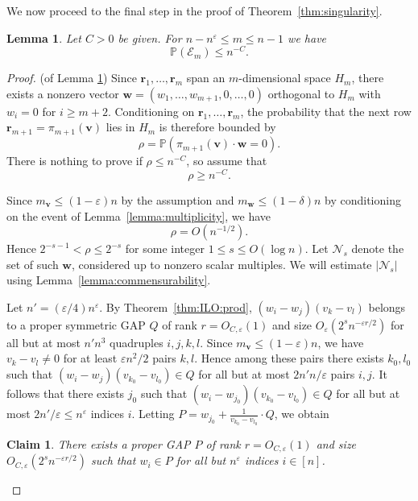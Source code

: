 \documentclass[reqno]{amsart}
\renewcommand\P{{\mathbb{P}}}
\newcommand\eps{{\varepsilon}}
\newcommand\BMr{{\bm r}}
\newcommand\BMv{{\bm v}}
\newcommand\BMw{{\bm w}}
\newcommand\CE{{\mathcal E}}
\newcommand\CN{{\mathcal N}}
\theoremstyle{plain}
\newtheorem{lemma}[theorem]{Lemma}
\newtheorem{claim}[theorem]{Claim}
\theoremstyle{definition}
\begin{document}
We now proceed to the final step in the proof of Theorem~\ref{thm:singularity}. 

\begin{lemma}\label{lemma:large:m}
Let $C>0$ be given. For $n-n^{\eps} \le m \le n-1$ we have
\[
\P(\CE_{m}) \le n^{-C}.
\]
\end{lemma}

\begin{proof}(of Lemma \ref{lemma:large:m}) Since $\BMr_1,\ldots,\BMr_m$ span an $m$-dimensional space $H_m$, there exists a nonzero vector
$\BMw=(w_1,\ldots,w_{m+1},0,\ldots,0)$ orthogonal to $H_m$ with $w_i=0$ for $i\ge m+2$.
Conditioning on $\BMr_1,\ldots,\BMr_m$, the probability that the next row
$\BMr_{m+1}=\pi_{m+1}(\BMv)$ lies in $H_m$ is therefore bounded by
\[
\rho = \P(\pi_{m+1}(\BMv) \cdot \BMw = 0).
\]
There is nothing to prove if $\rho\le n^{-C}$, so assume that
\[
\rho \ge n^{-C}.
\]

Since $m_{\BMv} \le (1-\eps)n$ by the assumption and $m_{\BMw}\le (1-\delta)n$ by conditioning on the event of Lemma~\ref{lemma:multiplicity}, we have 
\[
\rho = O(n^{-1/2}).
\]
Hence $2^{-s-1} <\rho \le 2^{-s}$ for some integer $1\le s\le O(\log n)$. Let $\CN_s$ denote the set of such $\BMw$, considered up to nonzero scalar multiples. We will estimate $|\CN_s|$ using Lemma~\ref{lemma:commensurability}.

Let $n'=(\eps/4) n^{\eps}$. 
By Theorem~\ref{thm:ILO:prod}, $(w_i-w_j)(v_k-v_l)$ belongs to a proper symmetric GAP $Q$ of rank $r=O_{C,\eps}(1)$ and size $O_{\eps}(2^{s}n^{-\eps r/2})$ for all but at most
$n'n^{3}$ quadruples $i,j,k,l$. Since $m_{\BMv}\le (1-\eps)n$, we have $v_k-v_l\neq 0$ for at least $\eps n^{2}/2$ pairs $k,l$. 
Hence among these pairs there exists $k_0,l_0$ such that $(w_i-w_j)(v_{k_0}-v_{l_0})\in Q$ for all but at most $2n'n/\eps$ pairs $i,j$. 
It follows that there exists $j_0$ such that $(w_i-w_{j_0})(v_{k_0}-v_{l_0})\in Q$ for all but at most $2n'/\eps \le n^{\eps}$ indices $i$. 
Letting $P=w_{j_0}+\frac{1}{v_{k_0}-v_{l_0}}\cdot Q$, we obtain

\begin{claim}\label{claim:AP}
There exists a proper GAP $P$ of rank $r=O_{C,\eps}(1)$ and size $O_{C,\eps}(2^{s}n^{-\eps r/2})$ such that $w_i\in P$ for all but 
$n^{\eps}$ indices $i\in[n]$.
\end{claim}


\end{proof}
\end{document}
